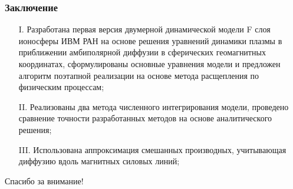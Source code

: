 \documentclass[9pt, apectratio=43,unicode]{beamer}
\begin{document}
\begin{frame}\frametitle{Заключение}
\begin{itemize}
\item[I.] Разработана первая версия двумерной динамической модели F слоя ионосферы ИВМ РАН на основе решения уравнений динамики плазмы в приближении амбиполярной диффузии в сферических геомагнитных координатах, сформулированы основные уравнения модели и предложен алгоритм поэтапной реализации на основе метода расщепления по физическим процессам;
\item[II.] Реализованы два метода численного интегрирования модели, проведено сравнение точности разработанных методов на основе аналитического решения;
\item[III.] Использована аппроксимация смешанных производных, учитывающая диффузию вдоль магнитных силовых линий;
\end{itemize}
\end{frame}


\begin{frame}[plain]
  \begin{center}
  {\Huge Спасибо за внимание!}
  \end{center}
\end{frame}
\end{document}
